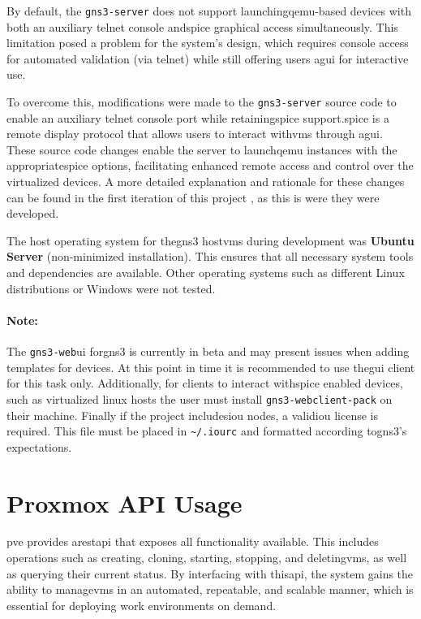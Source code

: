     By default, the \texttt{gns3-server} does not support launching\ac{qemu}-based devices with both an auxiliary telnet console 
    and\ac{spice} graphical access simultaneously. This limitation posed a problem for the system's design, which requires console 
    access for automated validation (via telnet) while still offering users a\ac{gui} for interactive use. 

    To overcome this, modifications were made to the \texttt{gns3-server} source code to enable an auxiliary telnet console port 
    while retaining\ac{spice} support.\ac{spice} is a remote display protocol that allows users to interact with\ac{vm}s through 
    a\ac{gui}. These source code changes enable the server to launch\ac{qemu} instances with the appropriate\ac{spice} 
    options, facilitating enhanced remote access and control over the virtualized devices. A more detailed explanation and rationale 
    for these changes can be found in the first iteration of this project \cite{santos2024}, as this is were they were developed.

    The host operating system for the\ac{gns3} host\ac{vm}s during development was \textbf{Ubuntu Server} (non-minimized 
    installation). This ensures that all necessary system tools and dependencies are available. Other operating systems 
    such as different Linux distributions or Windows were not tested.    

    \paragraph{Note:} The \texttt{gns3-web}\ac{ui} for\ac{gns3} is currently in beta and may present issues when adding 
    templates for devices. At this point in time it is recommended to use the\ac{gui} client for this task only.
    Additionally, for clients to interact with\ac{spice} enabled devices, such as virtualized linux hosts the user must install 
    \texttt{gns3-webclient-pack} on their machine. Finally if the project includes\ac{iou} nodes, a valid\ac{iou} license is 
    required. This file must be placed in \texttt{\textasciitilde{}/.iourc} and formatted according to\ac{gns3}'s expectations.

\section{Proxmox API Usage}

    \ac{pve} provides a\ac{rest}\ac{api} that exposes all functionality available. This includes operations such as 
    creating, cloning, starting, stopping, and deleting\ac{vm}s, as well as querying their current status. 
    By interfacing with this\ac{api}, the system gains the ability to manage\ac{vm}s in an automated, repeatable, and 
    scalable manner, which is essential for deploying work environments on demand.

